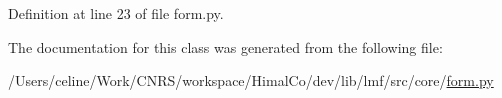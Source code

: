 Definition at line 23 of file form.\+py.



The documentation for this class was generated from the following file\+:\begin{DoxyCompactItemize}
\item 
/\+Users/celine/\+Work/\+C\+N\+R\+S/workspace/\+Himal\+Co/dev/lib/lmf/src/core/\hyperlink{form_8py}{form.\+py}\end{DoxyCompactItemize}
